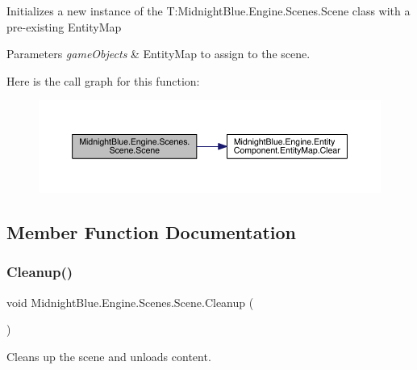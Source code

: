 Initializes a new instance of the T\+:\+Midnight\+Blue.\+Engine.\+Scenes.\+Scene class with a pre-\/existing Entity\+Map 


\begin{DoxyParams}{Parameters}
{\em game\+Objects} & Entity\+Map to assign to the scene.\\
\hline
\end{DoxyParams}
Here is the call graph for this function\+:
\nopagebreak
\begin{figure}[H]
\begin{center}
\leavevmode
\includegraphics[width=350pt]{class_midnight_blue_1_1_engine_1_1_scenes_1_1_scene_ae99d5a05cb0441676e6a41cd502eb0a4_cgraph}
\end{center}
\end{figure}


\subsection{Member Function Documentation}
\hypertarget{class_midnight_blue_1_1_engine_1_1_scenes_1_1_scene_a7200727dfc8a3c8b0d0b9cf54f920c92}{}\label{class_midnight_blue_1_1_engine_1_1_scenes_1_1_scene_a7200727dfc8a3c8b0d0b9cf54f920c92} 
\subsubsection{\texorpdfstring{Cleanup()}{Cleanup()}}
{\footnotesize\ttfamily void Midnight\+Blue.\+Engine.\+Scenes.\+Scene.\+Cleanup (\begin{DoxyParamCaption}{ }\end{DoxyParamCaption})\hspace{0.3cm}{\ttfamily [inline]}}



Cleans up the scene and unloads content. 

